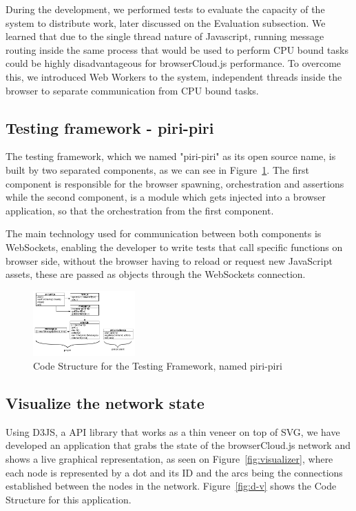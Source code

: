 During the development, we performed tests to evaluate the capacity of the system to distribute work, later discussed on the Evaluation subsection. We learned that due to the single thread nature of Javascript, running message routing inside the same process that would be used to perform CPU bound tasks could be highly disadvantageous for browserCloud.js performance. To overcome this, we introduced Web Workers to the system, independent threads inside the browser to separate communication from CPU bound tasks.

\subsection{Testing framework - piri-piri}

The testing framework, which we named "piri-piri" as its open source name, is built by two separated components, as we can see in Figure~\ref{fig:d-p-p}. The first component is responsible for the browser spawning, orchestration and assertions while the second component, is a module which gets injected into a browser application, so that the orchestration from the first component.

The main technology used for communication between both components is WebSockets, enabling the developer to write tests that call specific functions on browser side, without the browser having to reload or request new JavaScript assets, these are passed as objects through the WebSockets connection.

\begin{figure}[h!]
  \centering
  \includegraphics[width=0.35\textwidth]{figs/diagram-piri-piri}
  \caption{Code Structure for the Testing Framework, named piri-piri}
  \label{fig:d-p-p}
\end{figure}

\subsection{Visualize the network state}

Using D3JS, a API library that works as a thin veneer on top of SVG, we have developed an application that grabs the state of the browserCloud.js network and shows a live graphical representation, as seen on Figure~\ref{fig:visualizer}, where each node is represented by a dot and its ID and the arcs being the connections established between the nodes in the network. Figure~\ref{fig:d-v} shows the Code Structure for this application.


